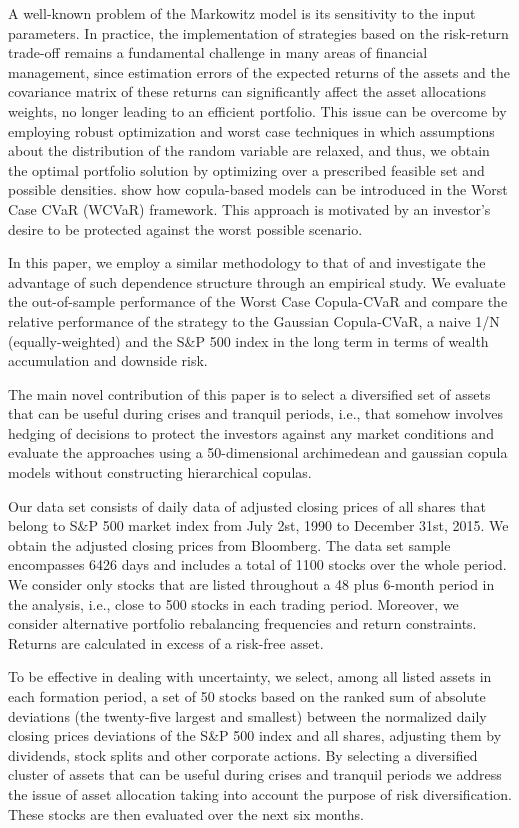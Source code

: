 \documentclass[a4paper,10pt]{article}
\begin{document}
A well-known problem of the Markowitz model is its sensitivity to the input parameters. In practice, the implementation of strategies based on the risk-return trade-off remains a fundamental challenge in many areas of financial management, since estimation errors of the expected returns of the assets and the covariance matrix of these returns can significantly affect the asset allocations weights, no longer leading to an efficient portfolio. This issue can be overcome by employing robust optimization and
worst case techniques \citet*{zhu2009worst} in which assumptions about the
distribution of the random variable are relaxed, and thus, we obtain the
optimal portfolio solution by optimizing over a prescribed feasible set and
possible densities. \citet*{kakouris14} show how copula-based models can be
introduced in the Worst Case CVaR (WCVaR) framework. This approach is
motivated by an investor's desire to be protected against the worst possible
scenario.

In this paper, we employ a similar methodology to that of \citet*{kakouris14}
and investigate the advantage of such dependence structure through an
empirical study. We evaluate the out-of-sample performance of the Worst Case Copula-CVaR and compare the relative performance of the strategy to the Gaussian Copula-CVaR, a naive 1/N (equally-weighted) and the S\&P 500
index in the long term in terms of wealth accumulation and downside risk.

The main novel contribution of this paper is to select a diversified set of assets that can be useful during crises and tranquil periods, i.e., that somehow involves hedging of decisions to protect the investors against any market conditions and evaluate the approaches using a 50-dimensional archimedean and gaussian copula models without constructing hierarchical copulas.  

Our data set consists of daily data of adjusted closing prices of all
shares that belong to S\&P 500 market index from July 2st, 1990 to December
31st, 2015. We obtain the adjusted closing prices from Bloomberg. The data
set sample encompasses 6426 days and includes a total of 1100 stocks over
the whole period. We consider only stocks that are listed throughout a 48
plus 6-month period in the analysis, i.e., close to 500 stocks in each
trading period. Moreover, we consider alternative portfolio rebalancing
frequencies and return constraints. Returns are calculated in excess of a risk-free asset.

To be effective in
dealing with uncertainty, we select, among all listed assets in each
formation period, a set of 50 stocks based on the ranked sum of absolute
deviations (the twenty-five largest and smallest) between the normalized
daily closing prices deviations of the S\&P 500 index
and all shares, adjusting them by dividends, stock splits and other
corporate actions. By selecting a diversified cluster of assets that can be
useful during crises and tranquil periods we address the issue of asset
allocation taking into account the purpose of risk diversification. These
stocks are then evaluated over the next six months.
\end{document}
